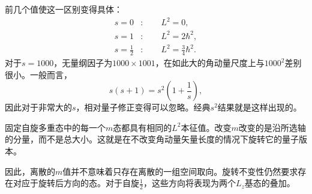 前几个值使这一区别变得具体：
\begin{align}
s=0 &: \qquad L^2=0,\\
s=1 &: \qquad L^2=2\hbar^2,\\
s=\frac12 &: \qquad L^2=\frac34\hbar^2.
\end{align}
对于\(s=1000\)，无量纲因子为\(1000\times1001\)，在如此大的角动量尺度上与\(1000^2\)差别很小。一般而言，
\begin{equation}
s(s+1)=s^2\left(1+\frac1s\right),
\end{equation}
因此对于非常大的\(s\)，相对量子修正变得可以忽略。经典\(s^2\)结果就是这样出现的。

固定自旋多重态中的每一个\(m\)态都具有相同的\(L^2\)本征值。改变\(m\)改变的是沿所选轴的分量，而不是总大小。这就是在不改变角动量矢量长度的情况下旋转它的量子版本。

\begin{classroomqa}
\end{classroomqa}

\begin{classroomqa}
\end{classroomqa}

\begin{classroomqa}
\end{classroomqa}

因此，离散的\(m\)值并不意味着只存在离散的一组空间取向。旋转不变性仍然要求存在对应于旋转后方向的态。对于自旋\(\tfrac12\)，这些方向将表现为两个\(L_z\)基态的叠加。

